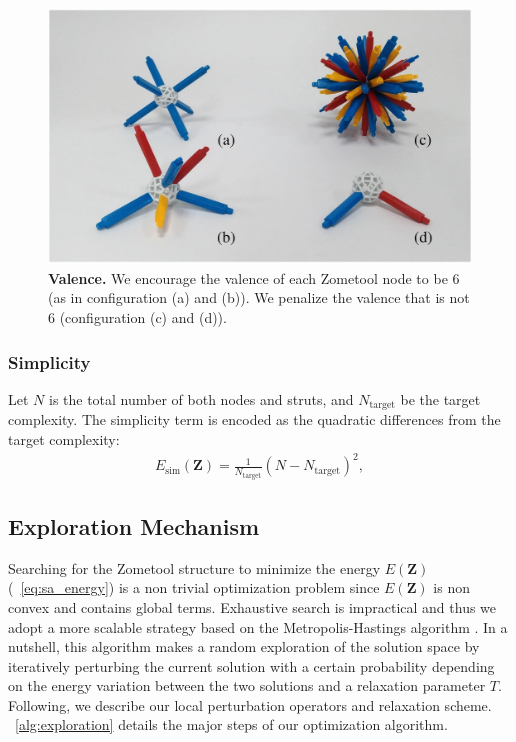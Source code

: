 \begin{figure}[ht]
\centering
\includegraphics[width=1.0\linewidth]{figs/Valence.pdf} 
\caption{\textbf{Valence.} We encourage the valence of each Zometool node to be 6 (as in configuration (a) and (b)). 
We penalize the valence that is not 6 (configuration (c) and (d)).
}
\label{fig:Valence}
\end{figure}

\subsubsection{Simplicity}
Let $N$ is the total number of both nodes and struts, and $N_\text{target}$ be the target complexity.
The simplicity term is encoded as the quadratic differences from the target complexity:
\begin{align}
E_{\text{sim}}(\mathbf{Z}) = \frac{1}{N_{\text{target}}}(N-N_{\text{target}})^2,
\end{align}

\subsection{Exploration Mechanism}
Searching for the Zometool structure to minimize the energy $E(\mathbf{Z})$ (\eqname~\ref{eq:sa_energy}) is a non trivial optimization problem since $E(\mathbf{Z})$ is non convex and contains global terms. 
Exhaustive search is impractical and thus we adopt a more scalable strategy based on the Metropolis-Hastings algorithm \cite{hastings:1970:monte}.
In a nutshell, this algorithm makes a random exploration of the solution space by iteratively perturbing the current solution with a certain probability depending on the energy variation between the two solutions and a relaxation parameter $T$.
Following, we describe our local perturbation operators and relaxation scheme.
\algoname~\ref{alg:exploration} details the major steps of our optimization algorithm.

